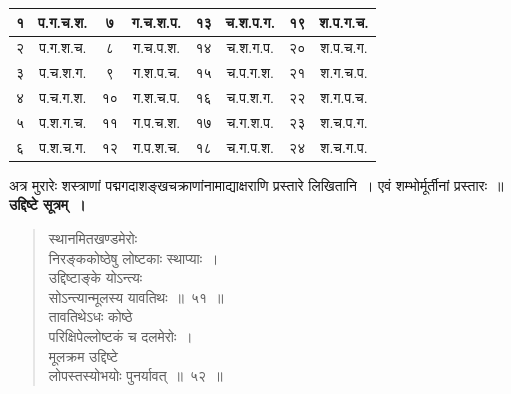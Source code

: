 \documentclass[11pt, openany]{book}
\begin{document}
\begin{table}[h]
	\centering
\begin{tabular}{|c|c|c|c|c|c|c|c|}
\hline
{\hbox{१}}  & {\hbox{प.ग.च.श.}}  &  {\hbox{७}}  &  {\hbox{ग.च.श.प.}}  & {\hbox{१३}}  & {\hbox{च.श.प.ग.}}  & {\hbox{१९}} & {\hbox{श.प.ग.च.}} \\
\hline
{\hbox{२}} &  {\hbox{प.ग.श.च.}}  &  {\hbox{८}} &  {\hbox{ग.च.प.श.}}  &  {\hbox{१४}} & {\hbox{च.श.ग.प.}}  & {\hbox{२०}} &  {\hbox{श.प.च.ग.}} \\
\hline
{\hbox{३}} &  {\hbox{प.च.श.ग.}}  &  {\hbox{९}} &  {\hbox{ग.श.प.च.}}  &  {\hbox{१५}} & {\hbox{च.प.ग.श.}}  &  {\hbox{२१}} & {\hbox{श.ग.च.प.}}\\
\hline
{\hbox{४}} & {\hbox{प.च.ग.श.}}  & {\hbox{१०}} &  {\hbox{ग.श.च.प.}}  &  {\hbox{१६}} & {\hbox{च.प.श.ग.}}  & {\hbox{२२}} &  {\hbox{श.ग.प.च.}}\\
\hline
{\hbox{५}} & {\hbox{प.श.ग.च.}}  &  {\hbox{११}}  &  {\hbox{ग.प.च.श.}}  & {\hbox{१७}} & {\hbox{च.ग.श.प.}}  & {\hbox{२३}} &  {\hbox{श.च.प.ग.}} \\
\hline
{\hbox{६}} & {\hbox{प.श.च.ग.}}  & {\hbox{१२}} &  {\hbox{ग.प.श.च.}}  & {\hbox{१८}} & {\hbox{च.ग.प.श.}} & {\hbox{२४}}  & {\hbox{श.च.ग.प.}} \\
\hline
\end{tabular}	
\end{table}

अत्र मुरारेः शस्त्राणां पद्मगदाशङ्खचक्राणांनामाद्याक्षराणि प्रस्तारे लिखितानि~। एवं शम्भोर्मूर्तीनां प्रस्तारः~॥\\

\textbf{उद्दिष्टे सूत्रम्~।} 

\begin{quote}
{\gk स्थानमितखण्डमेरोः\\
निरङ्ककोष्ठेषु लोष्टकाः स्थाप्याः~।\\
उद्दिष्टाङ्के योऽन्त्यः\\
सोऽन्त्यान्मूलस्य यावतिथः~॥~५१~॥\\
तावतिथेऽधः कोष्ठे\\
परिक्षिपेल्लोष्टकं च दलमेरोः~।\\
मूलक्रम उद्दिष्टे \\
लोपस्तस्योभयोः पुनर्यावत्~॥~५२~॥}	
\end{quote}

\newpage
\end{document}
